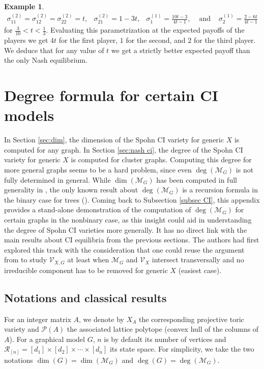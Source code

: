 \documentclass[11pt]{amsart}
\numberwithin{equation}{section}
\theoremstyle{plain}
\numberwithin{theorem}{section}
\theoremstyle{definition}
\newtheorem{example}[theorem]{Example}
\begin{document}
\begin{example}
\[\begin{array}{ccccc}
\sigma_{11}^{(2)}=\sigma_{12}^{(2)}=\sigma_{22}^{(2)}= t, &
\sigma_{21}^{(2)}= 1-3t, &
\sigma^{(1)}_{1}= \frac{10t-3}{4t-1}, & \text{ and } &
\sigma^{(1)}_{2}=\frac{2-6t}{4t-1}
\end{array}
\]
for $\frac{3}{10}<t<\frac{1}{3}$. Evaluating this parametrization at the expected payoffs of the players we get $4t$ for the first player, $1$ for the second, and $2$ for the third player. We deduce that for any value of $t$ we get a strictly better expected payoff than the only Nash equilibrium.

\end{example}

\appendix
\section{Degree formula for certain CI models}\label{appendix: degree CI}

In Section \ref{sec:dim}, the dimension of the Spohn CI variety for generic $X$ is computed for any graph. In Section \ref{sec:nash ci}, the degree of the Spohn CI variety for generic $X$ is computed for cluster graphs. Computing this degree for more general graphs seems to be a hard problem, since even $\deg(\mathcal M_G)$ is not fully determined in general. While $\dim(\mathcal M_G)$ has been computed in full generality in \cite[Corollary 2.7]{hocsten2002grobner}, the only known result about $\deg(\mathcal M_G)$ is a recursion formula in the binary case for trees (\cite[Theorem 5.5]{develin2003markov}). Coming back to Subsection \ref{subsec CI}, this appendix provides a stand-alone demonstration of the computation of $\deg(\mathcal M_G)$ for certain graphs in the nonbinary case, as this insight could aid in understanding the degree of Spohn CI varieties more generally. It has no direct link with the main results about CI equilibria from the previous sections. The authors had first explored this track with the consideration that one could reuse the argument from \cite[Theorem 6]{portakal2022geometry} to study $\mathcal V_{X,G}$ at least when $\mathcal M_G$ and $\mathcal V_X$ intersect transversally and no irreducible component has to be removed for generic $X$ (easiest case).

\subsection{Notations and classical results}
\label{classical}
For an integer matrix $A$, we denote by $X_A$ the corresponding projective toric variety and $\mathcal P(A)$ the associated lattice polytope (convex hull of the columns of $A$). For a graphical model $G$, $n$ is by default its number of vertices and $\mathcal R_{[n]}=[d_1]\times[d_2]\times\cdots\times[d_n]$ its state space. For simplicity, we take the two notations $\dim(G)=\dim(\mathcal M_G)$ and $\deg(G)=\deg(\mathcal M_G)$.
\end{document}

